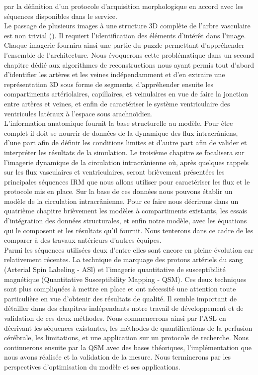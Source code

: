 par la définition d’un protocole d’acquisition morphologique en accord avec les séquences disponibles dans le service.\\
Le passage de plusieurs images à une structure 3D complète de l’arbre vasculaire est non trivial (\cite{Luboz2005}). Il requiert l’identification des éléments d’intérêt dans l’image. Chaque imagerie fournira ainsi 
une partie du puzzle permettant d’appréhender l’ensemble de l’architecture. Nous évoquerons cette problématique dans un second chapitre dédié aux algorithmes de reconstructions nous ayant permis tout 
d’abord d’identifier les artères et les veines indépendamment et d’en extraire une représentation 3D sous forme de segments, d’appréhender ensuite les compartiments artériolaires, capillaires, et
veinulaires en vue de faire la jonction entre artères et veines, et enfin de caractériser le système ventriculaire des ventricules latéraux à l’espace sous arachnoïdien.\\
L’information anatomique fournit la base structurelle au modèle. Pour être complet il doit se nourrir de données de la dynamique des flux intracrâniens, d’une part afin de définir les conditions 
limites et d’autre part afin de valider et interpréter les résultats de la simulation. Le troisième chapitre se focalisera sur l’imagerie dynamique de la circulation intracrânienne où, après quelques 
rappels sur les flux vasculaires et ventriculaires, seront brièvement présentées les principales séquences IRM que nous allons utiliser pour caractériser les flux et le protocole mis en place.
Sur la base de ces données nous pouvons établir un modèle de la circulation intracrânienne. Pour ce faire nous décrirons dans un quatrième chapitre brièvement les modèles à compartiments existants, 
les essais d’intégration des données structurales, et enfin notre modèle, avec les équations qui le composent et les résultats qu’il fournit. Nous tenterons dans ce cadre de les comparer à des travaux 
antérieurs d’autres équipes.\\
Parmi les séquences utilisées deux d’entre elles sont encore en pleine évolution car relativement récentes. La technique de marquage des protons artériels du sang (Arterial Spin Labeling - ASl) et l’imagerie 
quantitative de susceptibilité magnétique (Quantitative Susceptibility Mapping - QSM). Ces deux techniques sont plus compliquées à mettre en place et ont nécessité une attention toute particulière en vue d’obtenir des résultats de qualité. 
Il semble important de détailler dans des chapitres indépendants notre travail de développement et de validation de ces deux méthodes. Nous commencerons ainsi par l’ASL en décrivant 
les séquences existantes, les méthodes de quantifications de la perfusion cérébrale, les limitations, et une application sur un protocole de recherche. Nous continuerons ensuite par la QSM avec des bases théoriques, l’implémentation que nous avons réalisée et la validation de la mesure.
Nous terminerons par les perspectives d’optimisation du modèle et ses applications.\\

		
{}

